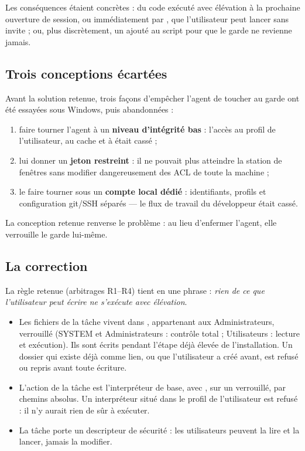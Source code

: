 Les conséquences étaient concrètes : du code exécuté avec élévation à la prochaine ouverture de
session, ou immédiatement par , que l'utilisateur peut lancer sans invite ;
ou, plus discrètement, un  ajouté au script pour que le garde ne revienne jamais.

\subsection{Trois conceptions écartées}
Avant la solution retenue, trois façons d'empêcher l'agent de toucher au garde ont été essayées
sous Windows, puis abandonnées :
\begin{enumerate}
  \item faire tourner l'agent à un \textbf{niveau d'intégrité bas} : l'accès au profil de
    l'utilisateur, au cache  et à  était cassé ;
  \item lui donner un \textbf{jeton restreint} : il ne pouvait plus atteindre la station de
    fenêtres sans modifier dangereusement des ACL de toute la machine ;
  \item le faire tourner sous un \textbf{compte local dédié} : identifiants, profils et
    configuration git/SSH séparés --- le flux de travail du développeur était cassé.
\end{enumerate}
La conception retenue renverse le problème : au lieu d'enfermer l'agent, elle verrouille le
garde lui-même.

\subsection{La correction}
La règle retenue (arbitrages R1--R4) tient en une phrase : \emph{rien de ce que l'utilisateur
peut écrire ne s'exécute avec élévation}.
\begin{itemize}
  \item Les fichiers de la tâche vivent dans ,
    appartenant aux Administrateurs, verrouillé (SYSTEM et Administrateurs : contrôle total ;
    Utilisateurs : lecture et exécution). Ils sont écrits pendant l'étape déjà élevée de
    l'installation. Un dossier qui existe déjà comme lien, ou que l'utilisateur a créé avant,
    est refusé ou repris avant toute écriture.
  \item L'action de la tâche est l'interpréteur de base, avec , sur un 
    verrouillé, par chemins absolus. Un interpréteur situé dans le profil de l'utilisateur est
    refusé : il n'y aurait rien de sûr à exécuter.
  \item La tâche porte un descripteur de sécurité : les utilisateurs peuvent la lire et la
    lancer, jamais la modifier.
\end{itemize}

